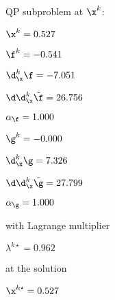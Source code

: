 QP subproblem at $\x^{k}$:

\bigskip
$\x^k=   0.527$


$\f^k =  -0.541$

$\d^k_{\x} \f =  -7.051$

$\d\d^k_{\x} \tilde \f =  26.756$

$\alpha_{\footnotesize\f} =   1.000$

\bigskip
$\g^k =  -0.000$

$\d^k_{\x}\g =   7.326$

$\d\d^k_{\x} \tilde \g =  27.799$

$\alpha_{\footnotesize\g} =   1.000$

\bigskip
with Lagrange multiplier

$\lambda^{k\star} =   0.962$

at the solution

$\x^{k\star} =   0.527$

